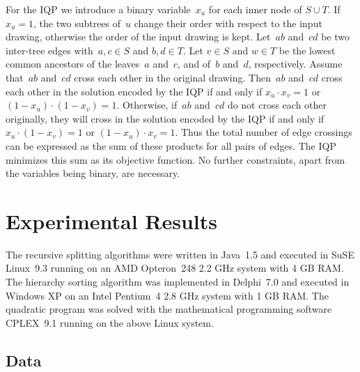 \documentclass[runningheads,a4paper]{llncs}
\begin{document}
For the IQP we introduce a binary variable~$x_u$ for each inner node
of $S \cup T$.  If~$x_u=1$, the two subtrees of~$u$ change their
order with respect to the input drawing, otherwise the order of the
input drawing is kept.  Let~$ab$ and~$cd$ be two inter-tree edges
with~$a,c \in S$ and $b,d \in T$.  Let $v \in S$ and $w \in T$ be
the lowest common ancestors of the leaves~$a$ and~$c$, and of~$b$
and~$d$, respectively.  Assume that~$ab$ and~$cd$ cross each other
in the original drawing.  Then~$ab$ and~$cd$ cross each other in the
solution encoded by the IQP if and only if $x_u \cdot x_v = 1$ or
$(1-x_u) \cdot (1-x_v) = 1$.  Otherwise, if~$ab$ and~$cd$ do not
cross each other originally, they will cross in the solution encoded
by the IQP if and only if $x_u \cdot (1-x_v) = 1$ or $(1-x_u) \cdot
x_v = 1$. Thus the total number of edge crossings can be expressed
as the sum of these products for all pairs of edges.  The IQP
minimizes this sum as its objective function. No further
constraints, apart from the variables being binary, are necessary.

\section{Experimental Results}\label{sec:experimental-results}

The recursive splitting algorithms were written in Java~1.5 and
executed in SuSE Linux~9.3 running on an AMD Opteron~248 2.2 GHz
system with 4 GB RAM.  The hierarchy sorting algorithm was implemented
in Delphi~7.0 and executed in Windows XP on an Intel Pentium~4 2.8 GHz
system with 1 GB RAM.  The quadratic program was solved with the
mathematical programming software CPLEX~9.1 running on the above Linux
system.

\subsection{Data}
\end{document}
